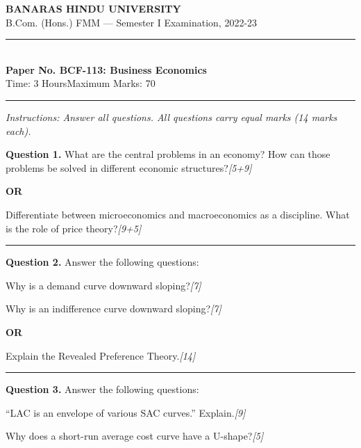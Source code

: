 \documentclass[11pt,a4paper]{article}
\newcommand{\pts}[1]{\hfill   \textit{[#1]}}
\begin{document}
\begin{center}
  {\large\bfseries BANARAS HINDU UNIVERSITY}\\[2pt]
  {\normalsize B.Com. (Hons.) FMM --- Semester I Examination, 2022-23}\\[6pt]
  \rule{0.8\linewidth}{0.5pt}\\[6pt]
  {\large\bfseries Paper No. BCF-113: Business Economics}\\[4pt]
  {\normalsize Time: 3 Hours\hfill Maximum Marks: 70}
\end{center}

\rule{\linewidth}{0.4pt}

\smallskip



\noindent   \textit{Instructions: Answer all questions. All questions carry equal marks (14 marks each).}

\bigskip




\noindent   \textbf{Question 1.}
What are the central problems in an economy? How can those problems be solved in different economic structures?\pts{5+9}

\centerline{   \textbf{OR}}

Differentiate between microeconomics and macroeconomics as a discipline. What is the role of price theory?\pts{9+5}

\medskip\rule{\linewidth}{0.2pt}




\noindent   \textbf{Question 2.}
Answer the following questions:

\begin{parts}
  \item Why is a demand curve downward sloping?\pts{7}
  \item Why is an indifference curve downward sloping?\pts{7}
\end{parts}

\centerline{   \textbf{OR}}

Explain the Revealed Preference Theory.\pts{14}

\medskip\rule{\linewidth}{0.2pt}




\noindent   \textbf{Question 3.}
Answer the following questions:

\begin{parts}
  \item ``LAC is an envelope of various SAC curves.'' Explain.\pts{9}
  \item Why does a short-run average cost curve have a U-shape?\pts{5}
\end{parts}
\end{document}
